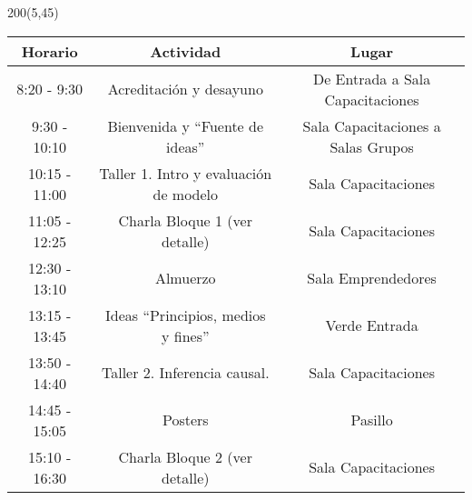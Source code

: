 \documentclass[a4paper,12pt]{article}
\begin{document}
\begin{textblock}{200}(5,45) \centering


\scalebox{1.4}{\large Viernes 4 de Agosto}

\selectfont

\large
\begin{tabular}{ccc}
\hline
\rowcolor{gray!20} \textbf{Horario} &  \hspace{2.8cm} \textbf{Actividad} \hspace{2.8cm}  &  \phantom{.}\hspace{2.9cm} \textbf{Lugar} \hspace{2.9cm} \\
\hline \hline
 8:20 - 9:30 & Acreditación y desayuno & De Entrada a Sala Capacitaciones \\
\hline
\rowcolor{gray!10}
9:30 - 10:10 & Bienvenida y ``Fuente de ideas'' & Sala Capacitaciones a Salas Grupos \\
\hline
10:15 - 11:00 & Taller 1. Intro y evaluación de modelo & Sala Capacitaciones \\
\hline
\rowcolor{gray!10}
11:05 - 12:25 & Charla Bloque 1 (ver detalle) & Sala Capacitaciones \\
\hline
\hline
 12:30 - 13:10 & Almuerzo & Sala Emprendedores \\
 13:15 - 13:45 & Ideas ``Principios, medios y fines'' & Verde Entrada \\
\hline
\hline
\rowcolor{gray!10}
13:50 - 14:40 & Taller 2. Inferencia causal. & Sala Capacitaciones \\
\hline
14:45 - 15:05 & Posters & Pasillo \\
\hline
\rowcolor{gray!10}
15:10 - 16:30 & Charla Bloque 2 (ver detalle) & Sala Capacitaciones \\
\hline

\end{tabular}

\end{textblock}
\end{document}
